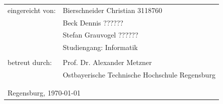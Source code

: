 \hskip 2.0cm
\begin{small}
\begin{tabular}{ll}
eingereicht von:\hspace{0.7cm} & Bierschneider Christian  3118760\tabularnewline
\hspace{0.7cm} & Beck Dennis  ??????\tabularnewline
\hspace{0.7cm} & Stefan Grauvogel  ??????\tabularnewline
 & Studiengang: Informatik\tabularnewline
 & \tabularnewline
 
 
betreut durch: & Prof. Dr. Alexander Metzner\tabularnewline
 & Ostbayerische Technische Hochschule Regensburg\tabularnewline
 & \tabularnewline
  & \tabularnewline
\multicolumn{2}{l}{Regensburg, \today}\tabularnewline
\end{tabular}
\end{small}
